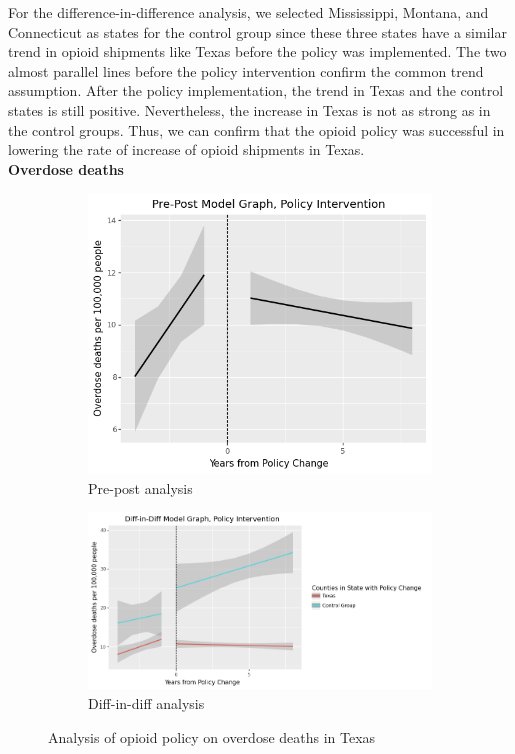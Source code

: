 \documentclass[12pt,letterpaper]{article}
\begin{document}
For the difference-in-difference analysis, we selected Mississippi, Montana, and Connecticut as states for the control group since these three states have a similar trend in opioid shipments like Texas before the policy was implemented. The two almost parallel lines before the policy intervention confirm the common trend assumption. After the policy implementation, the trend in Texas and the control states is still positive. Nevertheless, the increase in Texas is not as strong as in the control groups. Thus, we can confirm that the opioid policy was successful in lowering the rate of increase of opioid shipments in Texas. \\

\noindent \textbf{Overdose deaths}

\begin{figure}[!h]
\centering
\begin{subfigure}{.5\textwidth}
  \centering
  \includegraphics[width=0.7\linewidth]{../30_results/General_Results/texas_overdose_death_prepost.png}
  \caption{Pre-post analysis}
  \label{fig:tx_death_prepost}
\end{subfigure}%
\begin{subfigure}{.55\textwidth}
  \centering
  \includegraphics[width=1\linewidth]{../30_results/General_Results/texas_overdose_death_diffdiff.png}
  \caption{Diff-in-diff analysis}
  \label{fig:tx_death_did}
\end{subfigure}
\caption{Analysis of opioid policy on overdose deaths in Texas}
\label{fig:tx_death}
\end{figure}
\end{document}
